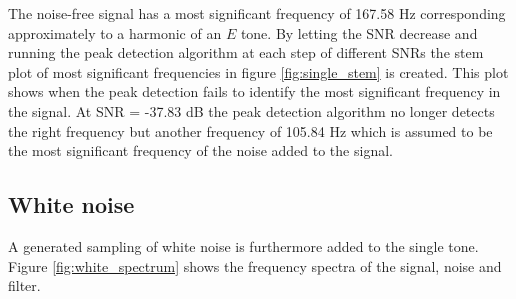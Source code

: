 The noise-free signal has a most significant frequency of 167.58 Hz corresponding approximately to a harmonic of an $E$ tone. By letting the SNR decrease and running the peak detection algorithm at each step of different SNRs the stem plot of most significant frequencies in figure \ref{fig:single_stem} is created. This plot shows when the peak detection fails to identify the most significant frequency in the signal. At SNR = -37.83 dB the peak detection algorithm no longer detects the right frequency but another frequency of 105.84 Hz which is assumed to be the most significant frequency of the noise added to the signal.

\subsection{White noise}
A generated sampling of white noise is furthermore added to the single tone. Figure \ref{fig:white_spectrum} shows the frequency spectra of the signal, noise and filter.

